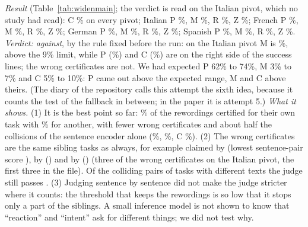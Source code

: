 \emph{Result} (Table~\ref{tab:widenmain}; the verdict is read on the Italian pivot, which no study had read): \textsf{C} \WidenSentC{}\% on every pivot; Italian \textsf{P} \WidenSentItP{}\%, \textsf{M} \WidenSentItM{}\%, \textsf{R} \WidenSentItR{}\%, \textsf{Z} \WidenSentItZ{}\%; French \textsf{P} \WidenSentFrP{}\%, \textsf{M} \WidenSentFrM{}\%, \textsf{R} \WidenSentFrR{}\%, \textsf{Z} \WidenSentFrZ{}\%; German \textsf{P} \WidenSentDeP{}\%, \textsf{M} \WidenSentDeM{}\%, \textsf{R} \WidenSentDeR{}\%, \textsf{Z} \WidenSentDeZ{}\%; Spanish \textsf{P} \WidenSentEsP{}\%, \textsf{M} \WidenSentEsM{}\%, \textsf{R} \WidenSentEsR{}\%, \textsf{Z} \WidenSentEsZ{}\%.
\emph{Verdict: against}, by the rule fixed before the run: on the Italian pivot \textsf{M} is \WidenSentItM{}\%, above the 9\% limit, while \textsf{P} (\WidenSentItP{}\%) and \textsf{C} (\WidenSentC{}\%) are on the right side of the success lines; the wrong certificates are not. We had expected \textsf{P} 62\% to 74\%, \textsf{M} 3\% to 7\% and \textsf{C} 5\% to 10\%: \textsf{P} came out above the expected range, \textsf{M} and \textsf{C} above theirs.
(The diary of the repository calls this attempt the sixth idea, because it counts the test of the fallback in between; in the paper it is attempt 5.)
\emph{What it shows.} (1) It is the best point so far: \WidenSentItP{}\% of the rewordings certified for their own task with \WidenSentItM{}\% for another, with fewer wrong certificates and about half the collisions of the sentence encoder alone (\WidenEncPlainTenFrP{}\%, \WidenEncPlainTenFrM{}\%, \textsf{C} \WidenEncPlainTenFrC{}\%). (2) The wrong certificates are the same sibling tasks as always, for example
\texttt{\WidenSentExOneTask{}} claimed by \texttt{\WidenSentExOneClaim{}} (lowest sentence-pair score \WidenSentExOneScore{}), \texttt{\WidenSentExTwoTask{}} by \texttt{\WidenSentExTwoClaim{}} (\WidenSentExTwoScore{}) and \texttt{\WidenSentExThreeTask{}} by \texttt{\WidenSentExThreeClaim{}} (\WidenSentExThreeScore{}) (three of the \WidenSentWrongCerts{} wrong certificates on the Italian pivot, the first three in the file). Of the \WidenSentCollNotSame{} colliding pairs of tasks with different texts the judge still passes \WidenSentCollPass{}. (3) Judging sentence by sentence did not make the judge stricter where it counts: the threshold that keeps the rewordings is so low that it stops only a part of the siblings. A small inference model is not shown to know that ``reaction'' and ``intent'' ask for different things; we did not test why.
